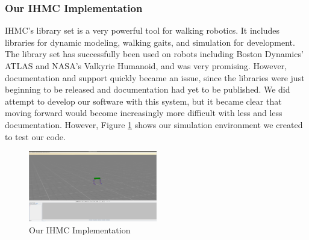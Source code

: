     \subsubsection{Our IHMC Implementation}
        IHMC's library set is a very powerful tool for walking robotics. It includes libraries for dynamic modeling, walking gaits, and simulation for development. The library set has successfully been used on robots including Boston Dynamics' ATLAS and NASA's Valkyrie Humanoid, and was very promising. However, documentation and support quickly became an issue, since the libraries were just beginning to be released and documentation had yet to be published. We did attempt to develop our software with this system, but it became clear that moving forward would become increasingly more difficult with less and less documentation. However, Figure \ref{fig:IHMCImplementation} shows our simulation environment we created to test our code.
        \begin{figure}
            \centering
           \includegraphics[width=0.5\textwidth]{figures/IHMCImplementation.png}
            \caption{Our IHMC Implementation}
            \label{fig:IHMCImplementation}
        \end{figure}